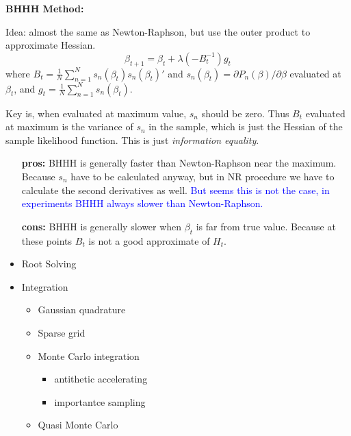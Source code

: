 \documentclass{book}
\theoremstyle{plain}
\theoremstyle{definition}
\begin{document}
\vspace{3mm}
\noindent
\textbf{BHHH Method:}

Idea: almost the same as Newton-Raphson, but use the outer product to approximate Hessian.
\[\beta_{t+1}=\beta_t + \lambda(-B^{-1}_t)g_t\]
where $B_t = \frac{1}{N}\sum_{n=1}^N{s_n(\beta_t)s_n(\beta_t)'}$
and $s_n(\beta_t)= \partial P_n(\beta)/\partial \beta$ evaluated at $\beta_t$,
and $g_t=\frac{1}{N}\sum_{n=1}^N{s_n(\beta_t)}$.

Key is, when evaluated at maximum value, $s_n$ should be zero. Thus $B_t$ evaluated at maximum is the variance of $s_n$ in the sample, which is just the Hessian of the sample likelihood function.
This is just \textit{information equality}.

\begin{itemize}
	\item [\textbf{pros:}] BHHH is generally faster than Newton-Raphson near the maximum.
	Because $s_n$ have to be calculated anyway, 
	but in NR procedure we have to calculate the second derivatives as well.
	\textcolor{blue}{But seems this is not the case, in experiments BHHH always slower than Newton-Raphson.}
	\item [\textbf{cons:}] BHHH is generally slower when $\beta_t$ is far from true value. 
	Because at these points $B_t$ is not a good approximate of $H_t$.
\end{itemize}



\begin{itemize}
	\item Root Solving
	\item Integration
	\begin{itemize}
		\item Gaussian quadrature
		\item Sparse grid
		\item Monte Carlo integration
		\begin{itemize}
			\item antithetic accelerating
			\item importantce sampling
		\end{itemize}
		\item Quasi Monte Carlo
	\end{itemize}
\end{itemize}




\end{document}
